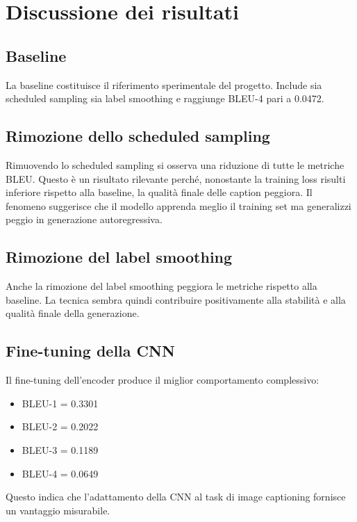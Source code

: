 \documentclass[12pt,a4paper]{article}
\begin{document}
\section{Discussione dei risultati}

\subsection{Baseline}

La baseline costituisce il riferimento sperimentale del progetto. Include sia scheduled sampling sia label smoothing e raggiunge BLEU-4 pari a 0.0472.

\subsection{Rimozione dello scheduled sampling}

Rimuovendo lo scheduled sampling si osserva una riduzione di tutte le metriche BLEU. Questo è un risultato rilevante perché, nonostante la training loss risulti inferiore rispetto alla baseline, la qualità finale delle caption peggiora. Il fenomeno suggerisce che il modello apprenda meglio il training set ma generalizzi peggio in generazione autoregressiva.

\subsection{Rimozione del label smoothing}

Anche la rimozione del label smoothing peggiora le metriche rispetto alla baseline. La tecnica sembra quindi contribuire positivamente alla stabilità e alla qualità finale della generazione.

\subsection{Fine-tuning della CNN}

Il fine-tuning dell'encoder produce il miglior comportamento complessivo:
\begin{itemize}[leftmargin=*]
    \item BLEU-1 = 0.3301
    \item BLEU-2 = 0.2022
    \item BLEU-3 = 0.1189
    \item BLEU-4 = 0.0649
\end{itemize}

Questo indica che l'adattamento della CNN al task di image captioning fornisce un vantaggio misurabile.
\end{document}
